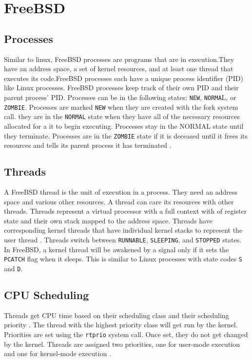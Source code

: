 \section{FreeBSD}
\subsection{Processes}
\noindent
Similar to linux, FreeBSD processes are programs that are in execution.They have an address space, a set of kernel resources, and at least one thread that executes its code.FreeBSD processes  each have a unique process identifier (PID) like Linux processes. FreeBSD processes keep track of their own PID and their parent process' PID. Processes can be in the following states: \lstinline{NEW}, \lstinline{NORMA}L, or \lstinline{ZOMBIE}. Processes are marked \lstinline{NEW} when they are created with the fork system call. they are in the \lstinline{NORMAL} state when they have all of the necessary resources allocated for a it to begin executing. Processes stay in the NORMAL state until they terminate. Processes are in the \lstinline{ZOMBIE} state if it is deceased until it frees its resources and tells its parent process it has terminated \cite{Freebsdtext}. 

\subsection{Threads}
\noindent
A FreeBSD thread is the unit of execution in a process. They need an address space and various other resources. A thread can care its resources with other threads. Threads represent a virtual processor with a full context with of register state and their own stack mapped to the address space\cite{Freebsdtext}. Threads have corresponding kernel threads that have individual kernel stacks to represent the user thread \cite{Freebsdtext}. Threads switch between \lstinline{RUNNABLE}, \lstinline{SLEEPING}, and \lstinline{STOPPED} states. In FreeBSD, a kernel thread will be awakened by a signal only if it sets the \lstinline{PCATCH} flag when it sleeps\cite{Freebsdtext}. This is similar to Linux processes with state codes \lstinline{S} and \lstinline{D}.

\subsection{CPU Scheduling}
\noindent
Threads get CPU time based on their scheduling class and their scheduling priority \cite{Freebsdtext}. The thread with the highest priority class will get run by the kernel. Priorities are set using the \lstinline{rtprio} system call. Once set, they do not get changed by the kernel. Threads are assigned two priorities, one for user-mode execution and one for kernel-mode execution \cite{Freebsdtext}.  




